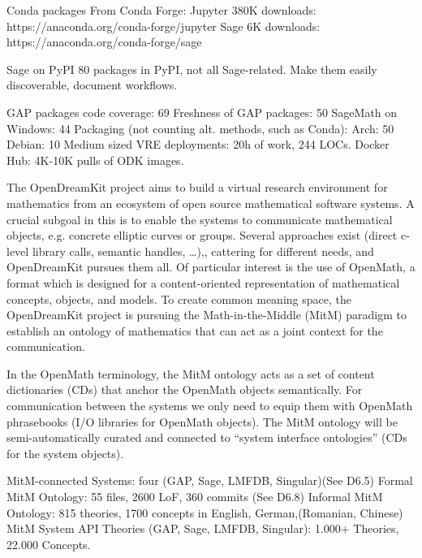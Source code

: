 \begin{Aim 1}
\begin{Aim 2}
\begin{itemize}
  Conda packages
      From Conda Forge:
      Jupyter 380K downloads: https://anaconda.org/conda-forge/jupyter
      Sage 6K downloads: https://anaconda.org/conda-forge/sage

      Sage on PyPI
      80 packages in PyPI, not all Sage-related.
      Make them easily discoverable, document workflows.


    GAP packages code coverage: 69%
    Freshness of GAP packages: 50%
    SageMath on Windows: 44%
    Packaging (not counting alt. methods, such as Conda):
    Arch: 50%
    Debian: 10%
    Medium sized VRE deployments: 20h of work, 244 LOCs.
    Docker Hub: 4K-10K pulls of ODK images.

The OpenDreamKit project aims to build a virtual research environment for mathematics from an ecosystem of open source mathematical software 
systems. A crucial subgoal in this is to enable the systems to communicate mathematical objects, e.g. concrete elliptic curves or groups.
Several approaches exist (direct c-level library calls, semantic handles, …),, cattering for different needs, and OpenDreamKit pursues them 
all. Of particular interest is the use of OpenMath, a format which is designed for a content-oriented representation of mathematical 
concepts, objects, and models. To create common meaning space, the OpenDreamKit project is pursuing the Math-in-the-Middle (MitM) paradigm 
to establish an ontology of mathematics that can act as a joint context for the communication.

In the OpenMath terminology, the MitM ontology acts as a set of content dictionaries (CDs) that anchor the OpenMath objects semantically. 
For communication between the systems we only need to equip them with OpenMath phrasebooks (I/O libraries for OpenMath objects). The MitM 
ontology will be semi-automatically curated and connected to “system interface ontologies” (CDs for the system objects).

MitM-connected Systems: four (GAP, Sage, LMFDB, Singular)(See D6.5)
Formal MitM Ontology: 55 files, 2600 LoF, 360 commits (See D6.8)
Informal MitM Ontology: 815 theories, 1700 concepts in English, German,(Romanian, Chinese)
MitM System API Theories (GAP, Sage, LMFDB, Singular): 1.000+ Theories, 22.000 Concepts.


\end{itemize}
\end{Aim 2}
\end{Aim 1}
